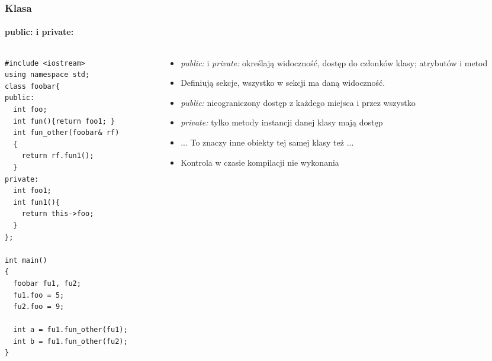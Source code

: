 \documentclass[10pt]{beamer}
\begin{document}
\begin{frame}[fragile]
  \frametitle{Klasa}
  \framesubtitle{public: i private:}
  \begin{columns}
    \begin{column}{0.48\textwidth}
\begin{lstlisting}
#include <iostream>
using namespace std;
class foobar{
public:
  int foo;
  int fun(){return foo1; }
  int fun_other(foobar& rf)
  {
    return rf.fun1();
  }
private:
  int foo1;
  int fun1(){
    return this->foo;
  }
};

int main()
{
  foobar fu1, fu2;
  fu1.foo = 5;
  fu2.foo = 9;
  
  int a = fu1.fun_other(fu1);
  int b = fu1.fun_other(fu2);
}
\end{lstlisting}
    \end{column}
    \begin{column}{0.48\textwidth}
      \begin{itemize}
        \item \textit{public:} i \textit{private:} określają widoczność, dostęp do członków klasy; atrybutów i metod
        \item Definiują sekcje, wszystko w sekcji ma daną widoczność.
        \item \textit{public:} nieograniczony dostęp z każdego miejsca i przez wszystko
        \item \textit{private:} tylko metody instancji danej klasy mają dostęp
        \item ... To znaczy inne obiekty tej samej klasy też ...
        \item Kontrola w czasie kompilacji nie wykonania
      \end{itemize}
    \end{column}
  \end{columns}
\end{frame}
\end{document}
